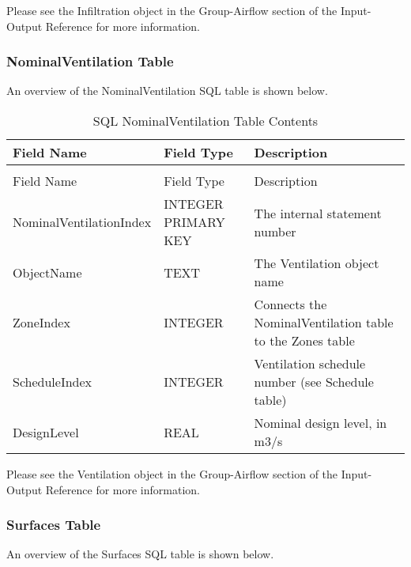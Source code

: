 Please see the Infiltration object in the Group-Airflow section of the Input-Output Reference for more information.

\subsubsection{NominalVentilation Table}

An overview of the NominalVentilation SQL table is shown below.

\begin{longtable}[c]{>{\raggedright}p{1.5in}>{\raggedright}p{1.5in}>{\raggedright}p{3.0in}}
\caption{SQL NominalVentilation Table Contents \label{table:table-24.-sql-nominalventilation-table}} \tabularnewline
\toprule 
Field Name & Field Type & Description \tabularnewline
\midrule
\endfirsthead

\caption[]{SQL NominalVentilation Table Contents} \tabularnewline
\toprule 
Field Name & Field Type & Description \tabularnewline
\midrule
\endhead

Nominal\-Ventilation\-Index & INTEGER PRIMARY KEY & The internal statement number \tabularnewline
ObjectName & TEXT & The Ventilation object name \tabularnewline
ZoneIndex & INTEGER & Connects the NominalVentilation table to the Zones table \tabularnewline
ScheduleIndex & INTEGER & Ventilation schedule number (see Schedule table) \tabularnewline
DesignLevel & REAL & Nominal design level, in m3/s \tabularnewline
\bottomrule
\end{longtable}

Please see the Ventilation object in the Group-Airflow section of the Input-Output Reference for more information.

\subsubsection{Surfaces Table}

An overview of the Surfaces SQL table is shown below.

